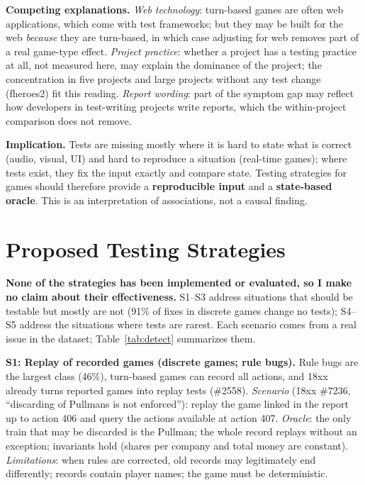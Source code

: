 \documentclass[10pt,twocolumn,a4paper]{article}
\newcommand{\para}[1]{\par\smallskip\noindent\textbf{#1}\enspace}
\begin{document}
\para{Competing explanations.}
\emph{Web technology}: turn-based games are often web applications, which come with test frameworks; but they may be built for the web \emph{because} they are turn-based, in which case adjusting for web removes part of a real game-type effect.
\emph{Project practice}: whether a project has a testing practice at all, not measured here, may explain the dominance of the project; the concentration in five projects and large projects without any test change (fheroes2) fit this reading.
\emph{Report wording}: part of the symptom gap may reflect how developers in test-writing projects write reports, which the within-project comparison does not remove.

\para{Implication.}
Tests are missing mostly where it is hard to state what is correct (audio, visual, UI) and hard to reproduce a situation (real-time games); where tests exist, they fix the input exactly and compare state.
Testing strategies for games should therefore provide a \textbf{reproducible input} and a \textbf{state-based oracle}.
This is an interpretation of associations, not a causal finding.

\section{Proposed Testing Strategies}\label{sec:strategies}

\textbf{None of the strategies has been implemented or evaluated, so I make no claim about their effectiveness.}
S1--S3 address situations that should be testable but mostly are not (91\% of fixes in discrete games change no tests); S4--S5 address the situations where tests are rarest.
Each scenario comes from a real issue in the dataset; Table~\ref{tab:detect} summarizes them.

\para{S1: Replay of recorded games (discrete games; rule bugs).}
Rule bugs are the largest class (46\%), turn-based games can record all actions, and 18xx already turns reported games into replay tests (\#2558).
\emph{Scenario} (18xx \#7236, ``discarding of Pullmans is not enforced''): replay the game linked in the report up to action 406 and query the actions available at action 407.
\emph{Oracle}: the only train that may be discarded is the Pullman; the whole record replays without an exception; invariants hold (shares per company and total money are constant).
\emph{Limitations}: when rules are corrected, old records may legitimately end differently; records contain player names; the game must be deterministic.
\end{document}
